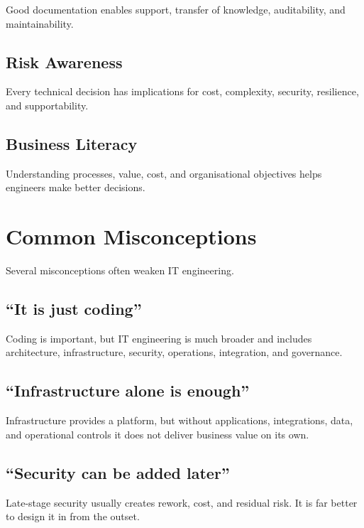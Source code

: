 \documentclass[
  british,
  letterpaper,
  DIV=11,
  numbers=noendperiod]{scrartcl}
\begin{document}
Good documentation enables support, transfer of knowledge, auditability,
and maintainability.

\subsection{Risk Awareness}\label{risk-awareness}

Every technical decision has implications for cost, complexity,
security, resilience, and supportability.

\subsection{Business Literacy}\label{business-literacy}

Understanding processes, value, cost, and organisational objectives
helps engineers make better decisions.

\section{Common Misconceptions}\label{common-misconceptions}

Several misconceptions often weaken IT engineering.

\subsection{``It is just coding''}\label{it-is-just-coding}

Coding is important, but IT engineering is much broader and includes
architecture, infrastructure, security, operations, integration, and
governance.

\subsection{``Infrastructure alone is
enough''}\label{infrastructure-alone-is-enough}

Infrastructure provides a platform, but without applications,
integrations, data, and operational controls it does not deliver
business value on its own.

\subsection{``Security can be added
later''}\label{security-can-be-added-later}

Late-stage security usually creates rework, cost, and residual risk. It
is far better to design it in from the outset.
\end{document}
